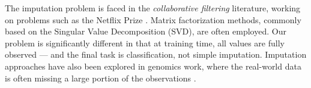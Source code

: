 The imputation problem is faced in the \emph{collaborative filtering} literature, working on problems such as the Netflix Prize \parencite{Koren-2009}.
Matrix factorization methods, commonly based on the Singular Value Decomposition (SVD), are often employed.
Our problem is significantly different in that at training time, all values are fully observed --- and the final task is classification, not simple imputation.
Imputation approaches have also been explored in genomics work, where the real-world data is often missing a large portion of the observations \parencite{Hastie-1999}.
